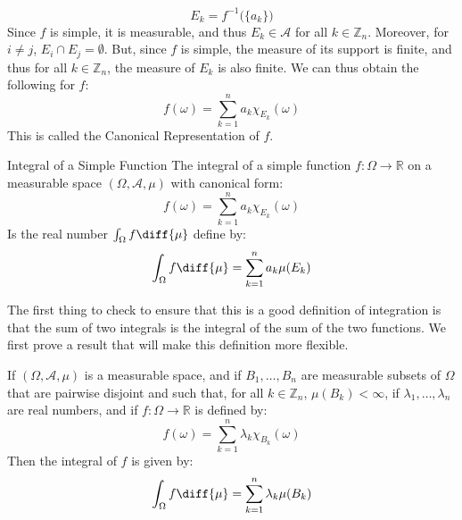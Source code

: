     \begin{equation}
        E_{k}=f^{-1}\big(\{a_{k}\}\big)
    \end{equation}
    Since $f$ is simple, it is measurable, and thus $E_{k}\in\mathcal{A}$ for
    all $k\in\mathbb{Z}_{n}$. Moreover, for $i\ne{j}$,
    $E_{i}\cap{E}_{j}=\emptyset$. But, since $f$ is simple, the measure of its
    support is finite, and thus for all $k\in\mathbb{Z}_{n}$, the measure of
    $E_{k}$ is also finite. We can thus obtain the following for $f$:
    \begin{equation}
        f(\omega)=\sum_{k=1}^{n}a_{k}\chi_{E_{k}}(\omega)
    \end{equation}
    This is called the \textrm{Canonical Representation} of $f$.
    \begin{ldefinition}{Integral of a Simple Function}
        The integral of a simple function $f:\Omega\rightarrow\mathbb{R}$ on a
        measurable space $(\Omega,\mathcal{A},\mu)$ with canonical form:
        \begin{equation}
            f(\omega)=\sum_{k=1}^{n}a_{k}\chi_{E_{k}}(\omega)
        \end{equation}
        Is the real number $\int_{\Omega}f\diff{\mu}$ define by:
        \begin{equation}
            \int_{\Omega}f\diff{\mu}=\sum_{k=1}^{n}a_{k}\mu(E_{k})
        \end{equation}
    \end{ldefinition}
    The first thing to check to ensure that this is a good definition of
    integration is that the sum of two integrals is the integral of the sum of
    the two functions. We first prove a result that will make this definition
    more flexible.
    \begin{theorem}
        If $(\Omega,\mathcal{A},\mu)$ is a measurable space, and if
        $B_{1},\dots,B_{n}$ are measurable subsets of $\Omega$ that are pairwise
        disjoint and such that, for all $k\in\mathbb{Z}_{n}$,
        $\mu(B_{k})<\infty$, if $\lambda_{1},\dots,\lambda_{n}$ are real
        numbers, and if $f:\Omega\rightarrow\mathbb{R}$ is defined by:
        \begin{equation}
            f(\omega)=\sum_{k=1}^{n}\lambda_{k}\chi_{B_{k}}(\omega)
        \end{equation}
        Then the integral of $f$ is given by:
        \begin{equation}
            \int_{\Omega}f\diff{\mu}=\sum_{k=1}^{n}\lambda_{k}\mu(B_{k})
        \end{equation}
    \end{theorem}

